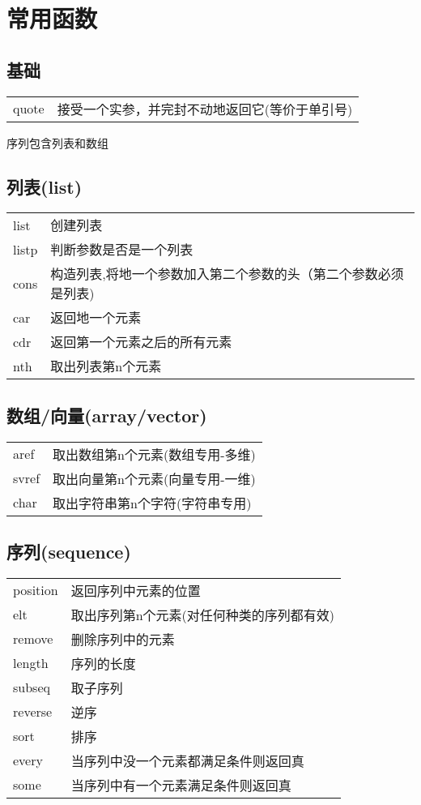 \documentclass{ctexart}
\begin{document}
\section{常用函数}
\subsection{基础}
\begin{tabular}{l l}
  quote    &接受一个实参，并完封不动地返回它(等价于单引号) \\
\end{tabular}
序列包含列表和数组
\subsection{列表(list)}
\begin{tabular}{l l}
  list     &创建列表 \\
  listp    &判断参数是否是一个列表 \\
  cons     &构造列表,将地一个参数加入第二个参数的头（第二个参数必须是列表) \\
  car      &返回地一个元素 \\
  cdr      &返回第一个元素之后的所有元素 \\
  nth      &取出列表第n个元素 \\
\end{tabular}
\subsection{数组/向量(array/vector)}
\begin{tabular}{l l}
  aref     &取出数组第n个元素(数组专用-多维) \\
  svref    &取出向量第n个元素(向量专用-一维) \\
  char     &取出字符串第n个字符(字符串专用) \\
\end{tabular}
\subsection{序列(sequence)}
\begin{tabular}{l l}
  position &返回序列中元素的位置 \\
  elt      &取出序列第n个元素(对任何种类的序列都有效) \\
  remove   &删除序列中的元素 \\
  length   &序列的长度 \\
  subseq   &取子序列 \\
  reverse  &逆序 \\
  sort     &排序 \\
  every    &当序列中没一个元素都满足条件则返回真 \\
  some     &当序列中有一个元素满足条件则返回真
\end{tabular}
\end{document}
